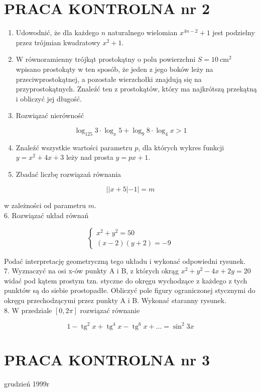 \documentclass[10pt]{article}
\begin{document}
\section*{PRACA KONTROLNA nr 2}
\begin{enumerate}
  \item Udowodnić, że dla każdego $n$ naturalnego wielomian $x^{4 n-2}+1$ jest podzielny przez trójmian kwadratowy $x^{2}+1$.
  \item W równoramienny trójkąt prostokątny o polu powierzchni $S=10 \mathrm{~cm}^{2}$ wpisano prostokąty w ten sposób, że jeden z jego boków leży na przeciwprostokątnej, a pozostałe wierzchołki znajdują się na przyprostokątnych. Znaleźć ten z prostokątów, który ma najkrótszą przekątną i obliczyć jej długość.
  \item Rozwiązać nierówność
\end{enumerate}

$$
\log _{125} 3 \cdot \log _{x} 5+\log _{9} 8 \cdot \log _{4} x>1
$$

\begin{enumerate}
  \setcounter{enumi}{3}
  \item Znaleźć wszystkie wartości parametru $p$, dla których wykres funkcji $y=x^{2}+4 x+3$ leży nad prosta $y=p x+1$.
  \item Zbadać liczbę rozwiązań równania
\end{enumerate}

$$
||x+5|-1|=m
$$

w zależności od parametru $m$.\\
6. Rozwiązać układ równań

$$
\left\{\begin{array}{l}
x^{2}+y^{2}=50 \\
(x-2)(y+2)=-9
\end{array}\right.
$$

Podać interpretację geometryczną tego układu i wykonać odpowiedni rysunek.\\
7. Wyznaczyć na osi x-ów punkty A i B, z których okrąg $x^{2}+y^{2}-4 x+2 y=20$ widać pod kątem prostym tzn. styczne do okręgu wychodzące z każdego z tych punktów są do siebie prostopadłe. Obliczyć pole figury ograniczonej stycznymi do okręgu przechodzącymi przez punkty A i B. Wykonać staranny rysunek.\\
8. W przedziale $[0,2 \pi]$ rozwiązać równanie

$$
1-\operatorname{tg}^{2} x+\operatorname{tg}^{4} x-\operatorname{tg}^{6} x+\ldots=\sin ^{2} 3 x
$$

\section*{PRACA KONTROLNA nr 3}
grudzień 1999r
\end{document}
